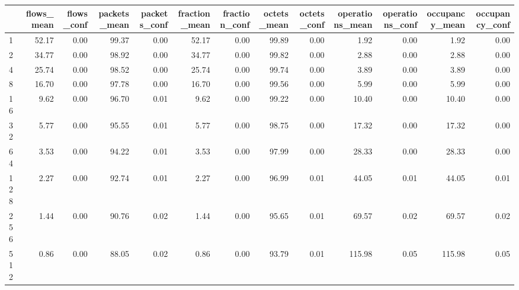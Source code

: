 \begin{tabular}{lrrrrrrrrrrrr}
\toprule
{} &  flows\_mean &  flows\_conf &  packets\_mean &  packets\_conf &  fraction\_mean &  fraction\_conf &  octets\_mean &  octets\_conf &  operations\_mean &  operations\_conf &  occupancy\_mean &  occupancy\_conf \\
\midrule
1        &       52.17 &        0.00 &         99.37 &          0.00 &          52.17 &           0.00 &        99.89 &         0.00 &             1.92 &             0.00 &            1.92 &            0.00 \\
2        &       34.77 &        0.00 &         98.92 &          0.00 &          34.77 &           0.00 &        99.82 &         0.00 &             2.88 &             0.00 &            2.88 &            0.00 \\
4        &       25.74 &        0.00 &         98.52 &          0.00 &          25.74 &           0.00 &        99.74 &         0.00 &             3.89 &             0.00 &            3.89 &            0.00 \\
8        &       16.70 &        0.00 &         97.78 &          0.00 &          16.70 &           0.00 &        99.56 &         0.00 &             5.99 &             0.00 &            5.99 &            0.00 \\
16       &        9.62 &        0.00 &         96.70 &          0.01 &           9.62 &           0.00 &        99.22 &         0.00 &            10.40 &             0.00 &           10.40 &            0.00 \\
32       &        5.77 &        0.00 &         95.55 &          0.01 &           5.77 &           0.00 &        98.75 &         0.00 &            17.32 &             0.00 &           17.32 &            0.00 \\
64       &        3.53 &        0.00 &         94.22 &          0.01 &           3.53 &           0.00 &        97.99 &         0.00 &            28.33 &             0.00 &           28.33 &            0.00 \\
128      &        2.27 &        0.00 &         92.74 &          0.01 &           2.27 &           0.00 &        96.99 &         0.01 &            44.05 &             0.01 &           44.05 &            0.01 \\
256      &        1.44 &        0.00 &         90.76 &          0.02 &           1.44 &           0.00 &        95.65 &         0.01 &            69.57 &             0.02 &           69.57 &            0.02 \\
512      &        0.86 &        0.00 &         88.05 &          0.02 &           0.86 &           0.00 &        93.79 &         0.01 &           115.98 &             0.05 &          115.98 &            0.05 \\

\end{tabular}

